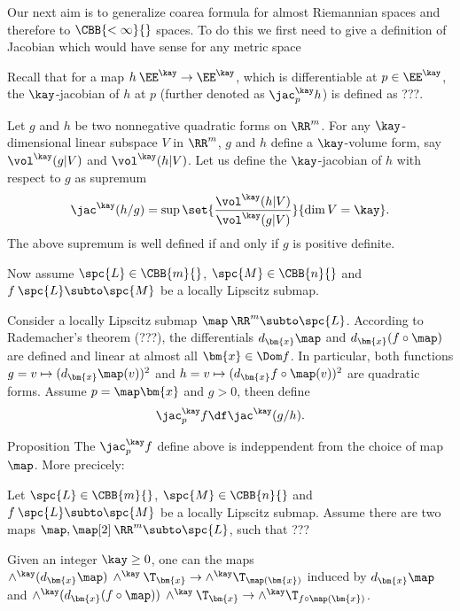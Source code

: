 Our next aim is to generalize coarea formula for almost Riemannian spaces and therefore to $\CBB{<\infty}{}$ spaces.
To do this we first need to give a definition of Jacobian which would have sense for any metric space

Recall that for a map $h\:\EE^\kay\to\EE^\kay$,
which is differentiable at $p\in \EE^\kay$,
the $\kay$-jacobian of $h$ at $p$ (further denoted as $\jac^\kay_p h$) 
is defined as ???.









Let $g$ and $h$ be two nonnegative quadratic forms on $\RR^m$.
For any $\kay$-dimensional linear subspace $V$ in $\RR^m$,
$g$ and $h$ define a $\kay$-volume form, say $\vol^\kay(g|V)$ and $\vol^\kay (h|V)$.
Let us define the $\kay$-jacobian of $h$ with respect to $g$ as supremum
$$\jac^\kay(h/g)=\sup\set{\frac{\vol^\kay(h|V)}{\vol^\kay(g|V)}}{\dim V=\kay}.$$
The above supremum is well defined if and only if $g$ is positive definite.

Now assume $\spc{L}\in \CBB{m}{}$, $\spc{M}\in \CBB{n}{}$
and $f\:  \spc{L}\subto \spc{M}$ be a locally Lipscitz submap.

Consider a locally Lipscitz submap $\map\: \RR^m\subto \spc{L}$.
According to Rademacher's theorem (???),
the differentials $d_{\bm{x}}\map$ and $d_{\bm{x}}(f\circ\map)$ are defined and linear at almost all $\bm{x}\in\Dom f$.
In particular, both functions $g=v\mapsto (d_{\bm{x}}\map(v))^2$ and $h=v\mapsto (d_{\bm{x}}f\circ\map(v))^2$ are quadratic forms.
Assume $p=\map \bm{x}$ and $g>0$, theen define 
$$\jac^\kay_p f
\df
\jac^\kay (g/h).$$


\begin{thm}{Proposition}
The $\jac^\kay_p f$ define above is indeppendent from the choice of map $\map$.
More precicely:

Let $\spc{L}\in \CBB{m}{}$, $\spc{M}\in \CBB{n}{}$
and $f\:  \spc{L}\subto \spc{M}$ be a locally Lipscitz submap.
Assume there are two maps $\map, \map[2]\: \RR^m\subto \spc{L}$,
such that ???
\end{thm}



Given an integer $\kay\ge0$,
one can the maps $\wedge^\kay (d_{\bm{x}}\map)\:\wedge^\kay\T_{\bm{x}}\to\wedge^\kay\T_{\map(\bm{x})}$ induced by $d_{\bm{x}}\map$
and $\wedge^\kay(d_{\bm{x}}(f\circ\map))\:\wedge^\kay\T_{\bm{x}}\to\wedge^\kay\T_{f\circ\map(\bm{x})}$.

